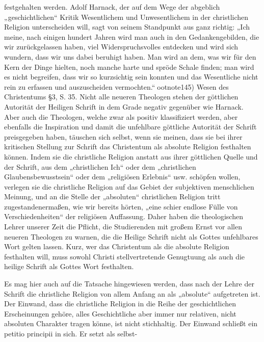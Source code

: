 festgehalten werden. Adolf Harnack, der auf dem Wege der abgeblich „geschichtlichen“ Kritik Wesentlichem und Unwesentlichem in der christlichen Religion unterscheiden will, sagt von seinem Standpunkt aus ganz richtig: „Ich meine, nach einigen hundert Jahren wird man auch in den Gedankengebilden, die wir zurückgelassen haben, viel Widerspruchsvolles entdecken und wird sich wundern, dass wir uns dabei beruhigt haben. Man wird an dem, was wir für den Kern der Dinge hielten, noch manche harte und spröde Schale finden; man wird es nicht begreifen, dass wir so kurzsichtig sein konnten und das Wesentliche nicht rein zu erfassen und auszuscheiden vermochten.“ootnote{145) Wesen des Christentums \S 3, S. 35.} Nicht alle neueren Theologen stehen der göttlichen Autorität der Heiligen Schrift in dem Grade negativ gegenüber wie Harnack. Aber auch die Theologen, welche zwar als positiv klassifiziert werden, aber ebenfalls die Inspiration und damit die unfehlbare göttliche Autorität der Schrift preisgegeben haben, täuschen sich selbst, wenn sie meinen, dass sie bei ihrer kritischen Stellung zur Schrift das Christentum als absolute Religion festhalten können. Indem sie die christliche Religion anstatt aus ihrer göttlichen Quelle und der Schrift, aus dem „christlichen Ich“ oder dem „christlichen Glaubensbewusstsein“ oder dem „religiösen Erlebnis“ usw. schöpfen wollen, verlegen sie die christliche Religion auf das Gebiet der subjektiven menschlichen Meinung, und an die Stelle der „absoluten“ christlichen Religion tritt zugestandenermaßen, wie wir bereits hörten, „eine schier endlose Fülle von Verschiedenheiten“ der religiösen Auffassung. Daher haben die theologischen Lehrer unserer Zeit die Pflicht, die Studierenden mit großem Ernst vor allen neueren Theologen zu warnen, die die Heilige Schrift nicht als Gottes unfehlbares Wort gelten lassen. Kurz, wer das Christentum als die absolute Religion festhalten will, muss sowohl Christi stellvertretende Genugtuung als auch die heilige Schrift als Gottes Wort festhalten.

Es mag hier auch auf die Tatsache hingewiesen werden, dass nach der Lehre der Schrift die christliche Religion von allem Anfang an als „absolute“ aufgetreten ist. Der Einwand, dass die christliche Religion in die Reihe der geschichtlichen Erscheinungen gehöre, alles Geschichtliche aber immer nur relativen, nicht absoluten Charakter tragen könne, ist nicht stichhaltig. Der Einwand schließt ein petitio principii in sich. Er setzt als selbst-